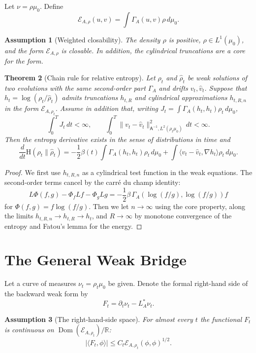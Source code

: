 \documentclass{article}
\newtheorem{theorem}{Theorem}[section]
\newtheorem{assumption}[theorem]{Assumption}
\newcommand{\Ent}{\mathrm H}
\newcommand{\Asf}{\mathsf A}
\newcommand{\Dom}{\operatorname{Dom}}
\begin{document}
Let \(\nu=\rho\mu_0\). Define
\[
        \mathcal E_{A,\rho}(u,v)=\int\Gamma_A(u,v)\rho\,d\mu_0.
\]

\begin{assumption}[Weighted closability]
\label{ass:weighted}
The density \(\rho\) is positive, \(\rho\in L^1(\mu_0)\), and the form
\(\mathcal E_{A,\rho}\) is closable. In addition, the cylindrical truncations
are a core for the form.
\end{assumption}

\begin{theorem}[Chain rule for relative entropy]
\label{thm:chain}
Let \(\rho_t\) and \(\hat\rho_t\) be weak solutions of two evolutions with the
same second-order part \(\Gamma_A\) and drifts \(v_t,\hat v_t\). Suppose that
\(h_t=\log(\rho_t/\hat\rho_t)\) admits truncations \(h_{t,R}\) and cylindrical
approximations \(h_{t,R,n}\) in the form \(\mathcal E_{A,\rho_t}\). Assume in
addition that, writing \(J_t=\int\Gamma_A(h_t,h_t)\rho_t\,d\mu_0\),
\[
        \int_0^T J_t\,dt<\infty,
        \qquad
        \int_0^T\|v_t-\hat v_t\|_{\Asf^{-1},L^2(\rho_t\mu_0)}^2\,dt<\infty .
\]
Then the entropy derivative exists in the sense of distributions in time and
\[
        \frac{d}{dt}\Ent(\rho_t\|\hat\rho_t)
        =
        -\frac12\beta(t)\int\Gamma_A(h_t,h_t)\rho_t\,d\mu_0
        +
        \int\langle v_t-\hat v_t,\nabla h_t\rangle\rho_t\,d\mu_0 .
\]
\end{theorem}

\begin{proof}
We first use \(h_{t,R,n}\) as a cylindrical test function in the weak
equations. The second-order terms cancel by the carr\'e du champ identity:
\[
        L\Phi(f,g)-\Phi_f Lf-\Phi_g Lg
        =
        -\frac12\beta\,\Gamma_A(\log(f/g),\log(f/g))f
\]
for \(\Phi(f,g)=f\log(f/g)\). Then we let \(n\to\infty\) using the core
property, along the limits \(h_{t,R,n}\to h_{t,R}\to h_t\), and
\(R\to\infty\) by monotone convergence of the entropy and Fatou's lemma for
the energy.
\end{proof}

\section{The General Weak Bridge}

Let a curve of measures \(\nu_t=\rho_t\mu_0\) be given. Denote the formal
right-hand side of the backward weak form by
\[
        F_t=\partial_t\nu_t-L_A^*\nu_t.
\]

\begin{assumption}[The right-hand-side space]
\label{ass:bridge}
For almost every \(t\) the functional \(F_t\) is continuous on
\(\Dom(\mathcal E_{A,\rho_t})/\mathbb R\):
\[
        |\langle F_t,\phi\rangle|
        \le C_t\mathcal E_{A,\rho_t}(\phi,\phi)^{1/2}.
\]
\end{assumption}
\end{document}
